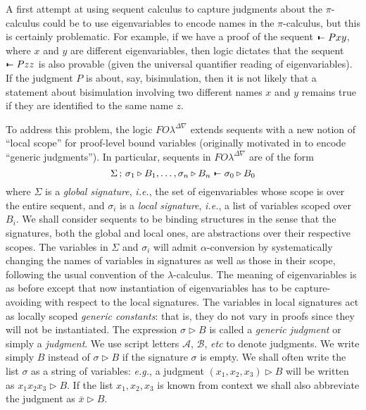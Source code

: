 \documentclass{acmtrans2m}
\newcommand{\ie}{{\em i.e.}}
\newcommand{\eg}{{\em e.g.}}
\def\Ascr{{\mathcal A}}
\def\Bscr{{\mathcal B}}
\def\relbar{\mathrel{\smash-}}
\def\joinrelm{\mathrel{\mkern-3.2mu}}
\def\tailpiece{\kern 1pt\vrule height 1ex width 0.3ex depth -.25ex}
\def\seqsym{\mathrel{\tailpiece\joinrelm\relbar}}
\newcommand{\FOL   }{FO\lambda}
\newcommand{\FOLDNb}{\FOL^{\Delta\nabla}}
\newcommand{\Judg}[2]{#1\triangleright#2}
\newcommand{\NSeq}[3]{#1\,;\,#2 \seqsym #3}
\newcommand{\Seq}[2]{#1\seqsym #2}
\begin{document}
A first attempt at using sequent calculus to capture judgments about
the $\pi$-calculus could be to use eigenvariables to encode names in
the $\pi$-calculus, but this is certainly problematic.  For example, if we
have a proof of the sequent $\Seq{}{P x y}$, where $x$ and $y$ are
different eigenvariables, then logic dictates that the sequent
$\Seq{}{P z z}$ is also provable (given the universal quantifier
reading of 
eigenvariables).  If the judgment $P$ is about, say,
bisimulation, then it is not likely that a statement about
bisimulation involving two different names $x$ and $y$ remains true if
they are identified to the same name $z$.

To address this problem, the logic $\FOLDNb$ extends sequents with a
new notion of ``local scope'' for proof-level bound variables
(originally motivated in \cite{miller03lics} to encode ``generic
judgments'').  In particular, sequents in $\FOLDNb$ are of the form
$$
\NSeq{\Sigma}{\Judg{\sigma_1}{B_1},\dots, \Judg{\sigma_n}{B_n}}
   {\Judg{\sigma_0}{B_0}}
$$
where $\Sigma$ is a {\em global signature}, \ie, the set of eigenvariables 
whose scope is over the entire sequent, and $\sigma_i$ is a {\em local signature}, \ie, 
a list of variables scoped over $B_i$. 
We shall consider sequents to be binding structures in the sense 
that the signatures, both the global and local
ones, are abstractions over their respective scopes.
The variables in 
$\Sigma$ and $\sigma_i$ will admit $\alpha$-conversion by systematically
changing the names of variables in signatures as well as those in
their scope, following the usual convention of the $\lambda$-calculus.
The meaning of eigenvariables is as before except that 
now instantiation of eigenvariables has to be capture-avoiding with respect
to the local signatures.
The variables in local signatures act as locally scoped {\em generic constants}:
that is, they do not vary in proofs since they will not be instantiated.
The expression $\Judg{\sigma}{B}$ is called a {\em generic judgment}
or simply a {\em judgment}. 
We use script letters $\Ascr$, $\Bscr$, {\em etc} to denote judgments.
We write simply $B$ instead of $\Judg{\sigma}{B}$ if the
signature $\sigma$ is empty. We shall often write 
the list $\sigma$ as a string of variables: \eg,
a judgment $\Judg{(x_1,x_2,x_3)}{B}$ will be written as $\Judg{x_1x_2x_3}{B}$.
If the list $x_1,x_2,x_3$ is known from context we shall also abbreviate the
judgment as $\Judg{\bar{x}}{B}$.
\end{document}
